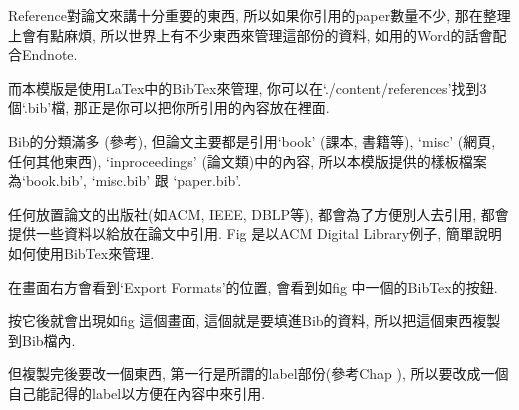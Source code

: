 

Reference對論文來講十分重要的東西, 所以如果你引用的paper數量不少, 那在整理上會有點麻煩, 所以世界上有不少東西來管理這部份的資料, 如用的Word的話會配合Endnote.

而本模版是使用LaTex中的BibTex來管理, 你可以在`./content/references'找到3個`.bib'檔, 那正是你可以把你所引用的內容放在裡面.

Bib的分類滿多 (參考), 但論文主要都是引用`book' (課本, 書籍等), `misc' (網頁, 任何其他東西), `inproceedings' (論文類)中的內容, 所以本模版提供的樣板檔案為`book.bib', `misc.bib' 跟 `paper.bib'.


任何放置論文的出版社(如ACM, IEEE, DBLP等), 都會為了方便別人去引用, 都會提供一些資料以給放在論文中引用. Fig  是以ACM Digital Library例子, 簡單說明如何使用BibTex來管理.



在畫面右方會看到`Export Formats'的位置, 會看到如fig 中一個的BibTex的按鈕.


按它後就會出現如fig 這個畫面, 這個就是要填進Bib的資料, 所以把這個東西複製到Bib檔內.


但複製完後要改一個東西, 第一行是所謂的label部份(參考Chap ), 所以要改成一個自己能記得的label以方便在內容中來引用.


\EndChapter
